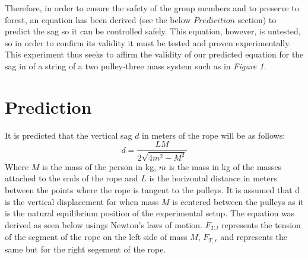 \documentclass[12pt,letterpaper]{article}
\begin{document}
\pagebreak
Therefore, in order to ensure the safety of the group members and to preserve to forest, an equation has been derived (see the below \(Predicition\) section) to predict the sag so it can be controlled safely. This equation, however, is untested, so in order to confirm its validity it must be tested and proven experimentally. This experiment thus seeks to affirm the validity of our predicted equation for the sag in of a string of a two pulley-three mass system such as in \textit{Figure 1}.
\section{Prediction}
It is predicted that the vertical sag \(d\) in meters of the rope will be as follows:
\begin{equation}
d = \frac{L M}{2\sqrt{4m^2 - M^2}}
\end{equation}
Where \(M\) is the mass of the person in kg, \(m\) is the mass in kg of the masses attached to the ends of the rope and \(L\) is the horizontal distance in meters between the points where the rope is tangent to the pulleys. It is assumed that d is the vertical displacement for when mass \(M\) is centered between the pulleys as it is the natural equilibrium position of the experimental setup. The equation was derived as seen below usings Newton's laws of motion. \(F_{T,l}\) represents the tension of the segment of the rope on the left side of mass \(M\), \(F_{T,r}\) and represents the same but for the right segement of the rope.
\end{document}
